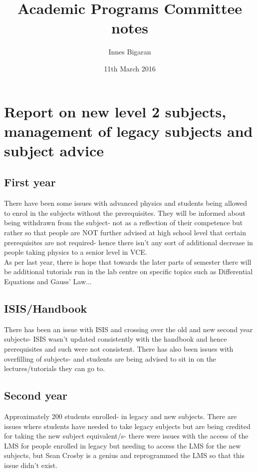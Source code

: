 \documentclass[11pt, oneside]{article}   	%
\title{Academic Programs Committee notes}
\author{Innes Bigaran }
\date{11th March 2016}							%
\begin{document}
\maketitle
\section{Report on new level 2 subjects, management of legacy subjects and subject advice}
\subsection{First year}
There have been some issues with advanced physics and students being allowed to enrol in the subjects without the prerequisites. They will be informed about being withdrawn from the subject- not as a reflection of their competence but rather so that people are NOT further advised at high school level that certain prerequisites are not required- hence there isn't any sort of additional decrease in people taking physics to a senior level in VCE. \\

As per last year, there is hope that towards the later parts of semester there will be additional tutorials run in the lab centre on specific topics such as Differential Equations and Gauss' Law...

\subsection{ISIS/Handbook}
There has been an issue with ISIS and crossing over the old and new second year subjects- ISIS wasn't updated consistently with the handbook and hence prerequisites and such were not consistent. There has also been issues with overfilling of subjects- and students are being advised to sit in on the lectures/tutorials they can go to.

\subsection{Second year}
Approximately 200 students enrolled- in legacy and new subjects. There are issues where students have needed to take legacy subjects but are being credited for taking the new subject equivalent/s- there were issues with the access of the LMS for people enrolled in legacy but needing to access the LMS for the new subjects, but Sean Crosby is a genius and reprogrammed the LMS so that this issue didn't exist. \\
\end{document}
